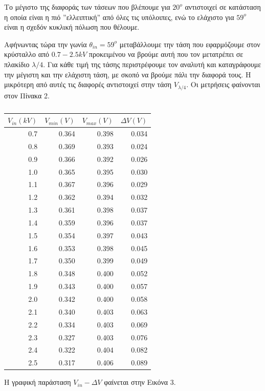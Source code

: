 \documentclass[a4paper]{article}
\begin{document}
	
	Το μέγιστο της διαφοράς των τάσεων που βλέπουμε για $20^o$ αντιστοιχεί σε κατάσταση η οποία είναι η πιό ''ελλειπτική'' από όλες τις υπόλοιπες, ενώ το ελάχιστο για $59^o$ είναι η σχεδόν κυκλική πόλωση που θέλουμε.
	
	Αφήνωντας τώρα την γωνία $\theta_{in} = 59^o$ μεταβάλλουμε την τάση που εφαρμόζουμε στον κρύσταλλο από $0.7-2.5kV$ προκειμένου να βρούμε αυτή που τον μετατρέπει σε πλακίδιο $\lambda/4$. Για κάθε τιμή της τάσης περιστρέφουμε τον αναλυτή και καταγράφουμε την μέγιστη και την ελάχιστη τάση, με σκοπό να βρούμε πάλι την διαφορά τους. Η μικρότερη από αυτές τις διαφορές αντιστοιχεί στην τάση $V_{\lambda/4}$. Οι μετρήσεις φαίνονται στον Πίνακα 2. 
	\begin{table}[h!]
		\centering
		\begin{tabular}{r|r|r|r}
		$V_{in}(kV)$ & $V_{min}(V)$ & $V_{max}(V)$ & $\Delta V(V)$ \\ 
		\hline\hline
		0.7&0.364&0.398&0.034\\
0.8&0.369&0.393&0.024\\
0.9&0.366&0.392&0.026\\
1.0&0.365&0.395&0.030\\
1.1&0.367&0.396&0.029\\
1.2&0.362&0.394&0.032\\
1.3&0.361&0.398&0.037\\
1.4&0.359&0.396&0.037\\
1.5&0.354&0.397&0.043\\
1.6&0.353&0.398&0.045\\
1.7&0.350&0.399&0.049\\
1.8&0.348&0.400&0.052\\
1.9&0.343&0.400&0.057\\
2.0&0.342&0.400&0.058\\
2.1&0.340&0.403&0.063\\
2.2&0.334&0.403&0.069\\
2.3&0.327&0.403&0.076\\
2.4&0.322&0.404&0.082\\
2.5&0.317&0.406&0.089
		\end{tabular}
		\caption{ }
	\end{table}
	Η γραφική παράσταση $V_{in} - \Delta V$ φαίνεται στην Εικόνα 3. 
\end{document}
